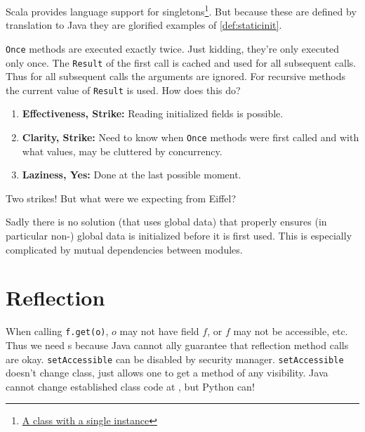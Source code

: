 \documentclass{article}
\begin{document}
\begin{example}
  Scala provides language support for singletons\footnote{\href{https://en.wikipedia.org/wiki/Singleton_pattern}{A class with a single instance}}.
  But because these are defined by translation to Java they are glorified examples of \ref{def:staticinit}.
\end{example}

\begin{definition}
  \texttt{Once} methods are executed exactly twice.
  Just kidding, they're only executed only once.
  The \texttt{Result} of the first call is cached and used for all subsequent calls.
  Thus for all subsequent calls the arguments are ignored.
  For recursive methods the current value of \texttt{Result} is used.
  How does this do?
  \begin{enumerate}
  \item \textbf{Effectiveness, Strike:} Reading initialized fields is possible.
  \item \textbf{Clarity, Strike:} Need to know when \texttt{Once} methods were first called and with what values, may be cluttered by concurrency.
  \item \textbf{Laziness, Yes:} Done at the last possible moment.
  \end{enumerate}
  Two strikes!
  But what were we expecting from Eiffel?
\end{definition}

Sadly there is no solution (that uses global data) that properly ensures (in particular non-\cringe{}) global data is initialized before it is first used.
This is especially complicated by mutual dependencies between modules.

\section{Reflection}

When calling \texttt{f.get(o)}, $o$ may not have field $f$,
or $f$ may not be accessible, etc.
Thus we need \runtimecheck{}s because Java cannot \static{}ally guarantee that reflection method calls are okay.
\texttt{setAccessible} can be disabled by security manager.
\texttt{setAccessible} doesn't change class, just allows one to get a method of any visibility.
Java cannot change established class code at \runtime{}, but Python can!
\end{document}
